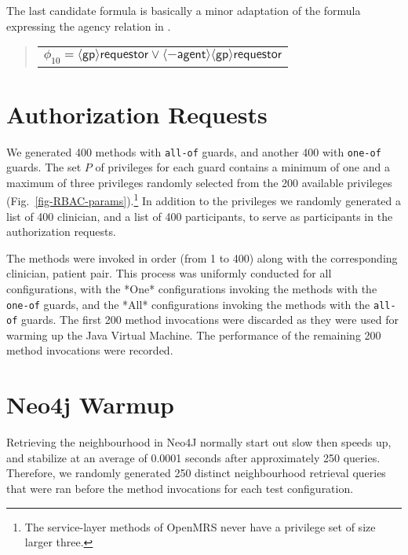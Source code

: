 \documentclass{acm_proc_article-sp}
\newcommand{\textcode}[1]{\texttt{#1}}
\begin{document}
The last candidate formula is basically a minor adaptation of the
formula expressing the agency relation in \cite[\S 5.2]{Fong:2011}.
\begin{quote}
\begin{tabular}{l}
$\phi_{10} = \langle \mathsf{gp} \rangle
   \mathsf{requestor} \lor 
    \langle -\mathsf{agent} \rangle
  \langle \mathsf{gp} \rangle
 \mathsf{requestor}$
\end{tabular}
\end{quote}
\begin{comment}
\[
\phi_{10} = \langle \mathsf{gp} \rangle
   \mathsf{requestor} \lor 
    \langle -\mathsf{agent} \rangle
  \langle \mathsf{gp} \rangle
 \mathsf{requestor}
\]
\end{comment}


\section{Authorization Requests}
\label{app-requests}

We generated 400 methods with \textcode{all-of} guards, and another
400 with \textcode{one-of} guards.  The set $P$ of privileges for each
guard contains a minimum of one and a maximum of three privileges 
randomly selected from the 200 available privileges 
(Fig.~\ref{fig-RBAC-params}).\footnote{The service-layer methods of 
OpenMRS never have a privilege set of size larger three.} In addition
to the privileges we randomly generated a list of 400 clinician, and
a list of 400 participants, to serve as participants in the
authorization requests.

The methods were invoked in order (from 1 to 400) along with the
corresponding clinician, patient pair. This process was uniformly
conducted for all configurations, with the *\textsf{One}*
configurations invoking the methods with the \textcode{one-of} guards,
and the *\textsf{All}* configurations invoking the methods with the
\textcode{all-of} guards. The first 200 method invocations were
discarded as they were used for warming up the Java Virtual Machine.
The performance of the remaining 200 method invocations were recorded.

\section{N\MakeLowercase{eo}4\MakeLowercase{j} Warmup}
Retrieving the neighbourhood in Neo4J normally start out slow then 
speeds up, and stabilize at an average of 0.0001 seconds after
approximately 250 queries. Therefore, we randomly generated 250 distinct
neighbourhood retrieval queries that were ran before the method 
invocations for each test configuration.


\begin{comment}
We randomly generate 50 method invocations to be shared by the
*\textsf{One}* configurations, and another 50 method invocations to be
shared by the *\textsf{All}* configurations.  Every time a
configuration is tested, 50 fresh user-patient pairs will be generated
for the 50 method calls of that configuration.
\end{comment}
\end{document}
